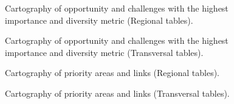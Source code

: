 \clearpage


\begin{figure}[h!]
\caption{Cartography of opportunity and challenges  with the highest importance and diversity metric (Regional tables).}
\label{fig:reg_AC}
\end{figure}
\clearpage

\begin{figure}[h!]
\caption{Cartography of opportunity and challenges  with the highest importance and diversity metric (Transversal tables).}
\label{fig:trans_AC}
\end{figure}
\clearpage

\begin{figure}[h!]
\caption{Cartography of priority areas and links (Regional tables).}
\label{fig:reg}
\end{figure}
\clearpage

\begin{figure}[h!]
\caption{Cartography of priority areas and links (Transversal tables).}
\label{fig:trans}
\end{figure}
\clearpage
